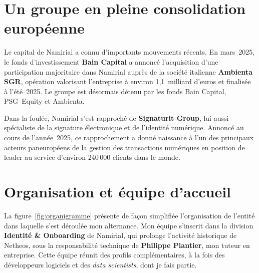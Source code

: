 \section{Un groupe en pleine consolidation européenne}

Le capital de Namirial a connu d'importants mouvements récents. En mars~2025, le fonds
d'investissement \textbf{Bain Capital} a annoncé l'acquisition d'une participation
majoritaire dans Namirial auprès de la société italienne \textbf{Ambienta SGR},
opération valorisant l'entreprise à environ 1,1~milliard d'euros et finalisée à
l'été~2025. Le groupe est désormais détenu par les fonds Bain Capital, PSG~Equity et
Ambienta.

Dans la foulée, Namirial s'est rapproché de \textbf{Signaturit Group},
lui aussi spécialiste de la signature électronique et de l'identité numérique. Annoncé
au cours de l'année~2025, ce rapprochement a donné naissance à l'un des principaux
acteurs paneuropéens de la gestion des transactions numériques en position de leader au service d'environ 240\,000 clients dans le
monde.

\section{Organisation et équipe d'accueil}

La figure~\ref{fig:organigramme} présente de façon simplifiée l'organisation de
l'entité dans laquelle s'est déroulée mon alternance. Mon équipe s'inscrit dans la
division \textbf{Identité \& Onboarding} de Namirial, qui prolonge l'activité
historique de Netheos, sous la responsabilité technique de \textbf{Philippe Plantier},
mon tuteur en entreprise. Cette équipe réunit des profils complémentaires, à la fois
des développeurs logiciels et des \emph{data scientists}, dont je fais partie.

